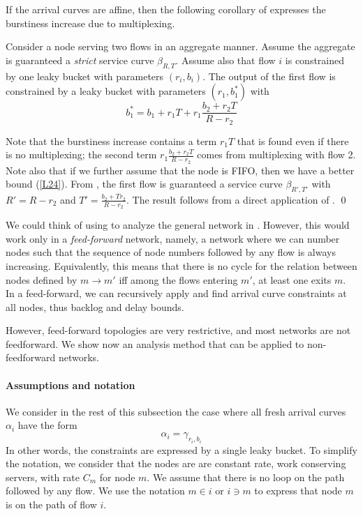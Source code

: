 If the arrival curves are affine, then the following corollary of
 expresses the burstiness increase due to
multiplexing.
\begin{corollary}
Consider a node serving two flows in an aggregate manner. Assume
the aggregate is guaranteed a \emph{strict} service curve
$\beta_{R,T}$. Assume also that flow $i$ is constrained by one
leaky bucket with parameters $(r_i,b_i)$. The output of the first
flow is constrained by a leaky bucket with parameters $(r_1,
b^*_1)$ with
$$
b^*_1 = b_1 + r_1 T + r_1 \frac{b_2+ r_2 T}{R-r_2}
$$
\end{corollary}
Note that the burstiness increase contains a term $r_1 T$ that is
found even if there is no multiplexing; the second term $r_1
\frac{b_2+ r_2 T}{R-r_2}$ comes from multiplexing with flow 2.
Note also that if we further assume that the node is FIFO, then we
have a better bound (\cref{L24}).
\pr
From , the first flow is guaranteed a service
curve $\beta_{R', T'}$ with $R'=R-r_2$ and $T'= \frac{b_2 +T
r_2}{R-r_2}$. The result follows from a direct application of
. \qed

We could think of using  to analyze the general
network in . However, this would work only
in a \emph{feed-forward} network, namely, a network where we can
number nodes such that the sequence of node numbers followed by
any flow is always increasing. Equivalently, this means that there
is no cycle for the relation between nodes defined by $m
\rightarrow m'$ iff among the flows entering $m'$, at least one
exits $m$. In a feed-forward, we can recursively apply
 and find arrival curve constraints at all nodes,
thus backlog and delay bounds.

However, feed-forward topologies are very restrictive, and most
networks are not feedforward. We show now an analysis method that
can be applied to non-feedforward networks.

\paragraph{Assumptions and notation}

We consider in the rest of this subsection the case where all
fresh arrival curves $\alpha_i$ have the form
$$
\alpha_i=\gamma_{r_i, b_i}$$ In other words, the constraints are
expressed by a single leaky bucket. To simplify the notation, we
consider that the nodes are are constant rate, work conserving
servers, with rate $C_m$ for node $m$. We assume that there is no
loop on the path followed by any flow. We use the notation $m \in
i$ or $i\ni m$ to express that node $m$ is on the path of flow
$i$.

